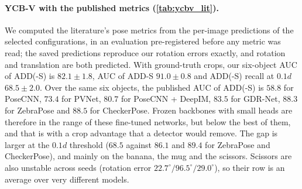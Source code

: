 \begin{table}[t]
  \centering\footnotesize
  \setlength{\tabcolsep}{4pt}
  
  \caption{\textbf{T-LESS with the BOP metrics} (\%, higher is better), real BOP19 test targets. Not a matched comparison: published rows are means over all 30 objects with their own detections or masks, and ours covers 7 objects with \emph{ground-truth crops}, which favours ours. The BOP toolkit pools over instances, so the instance-pooled row is the one defined as in the published rows; object 1 has 886 of our 2{,}345 instances (per object: \cref{tab:tless_ar_perobj}). Ours: multi-path PoE trees before distillation, because the translation block is attached to that tree; orbit voting, predicted rotation and translation, 3 seeds. We did not compute AR$_\text{VSD}$, which needs rendering against the depth images, so we claim no overall AR.}
  \label{tab:tless_ar}
\end{table}

\begin{table}[t]
  \centering\footnotesize
  \setlength{\tabcolsep}{3.5pt}
  \resizebox{\linewidth}{!}{}
  \caption{\textbf{Methods built on pretrained or frozen models}, BOP AR (\%) over all objects of T-LESS (30) and YCB-V (21), novel-object setting. Published values as reported by each source; these methods need a CAD model but no per-object training, which is a different problem from ours. We have no AR on the same object sets (\cref{tab:tless_ar}), so our row has no AR value; the table compares designs, not accuracy.}
  \label{tab:foundation_lit}
\end{table}

\paragraph{YCB-V with the published metrics (\cref{tab:ycbv_lit}).} We computed the literature's pose metrics from the per-image predictions of the selected configurations, in an evaluation pre-registered before any metric was read; the saved predictions reproduce our rotation errors exactly, and rotation and translation are both predicted. With ground-truth crops, our six-object AUC of ADD(-S) is $82.1\pm1.8$, AUC of ADD-S $91.0\pm0.8$ and ADD(-S) recall at $0.1d$ $68.5\pm2.0$. Over the same six objects, the published AUC of ADD(-S) is $58.8$ for PoseCNN, $73.4$ for PVNet, $80.7$ for PoseCNN + DeepIM, $83.5$ for GDR-Net, $88.3$ for ZebraPose and $88.5$ for CheckerPose. Frozen backbones with small heads are therefore in the range of these fine-tuned networks, but below the best of them, and that is with a crop advantage that a detector would remove. The gap is larger at the $0.1d$ threshold ($68.5$ against $86.1$ and $89.4$ for ZebraPose and CheckerPose), and mainly on the banana, the mug and the scissors. Scissors are also unstable across seeds (rotation error $22.7^\circ/96.5^\circ/29.0^\circ$), so their row is an average over very different models.

